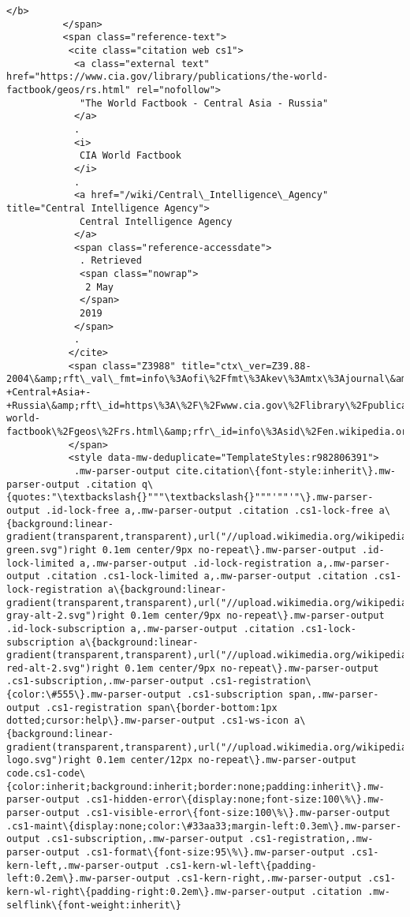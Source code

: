 \documentclass[11pt]{article}
\begin{document}
\begin{Verbatim}[commandchars=\\\{\}]
           </b>
          </span>
          <span class="reference-text">
           <cite class="citation web cs1">
            <a class="external text" href="https://www.cia.gov/library/publications/the-world-factbook/geos/rs.html" rel="nofollow">
             "The World Factbook - Central Asia - Russia"
            </a>
            .
            <i>
             CIA World Factbook
            </i>
            .
            <a href="/wiki/Central\_Intelligence\_Agency" title="Central Intelligence Agency">
             Central Intelligence Agency
            </a>
            <span class="reference-accessdate">
             . Retrieved
             <span class="nowrap">
              2 May
             </span>
             2019
            </span>
            .
           </cite>
           <span class="Z3988" title="ctx\_ver=Z39.88-2004\&amp;rft\_val\_fmt=info\%3Aofi\%2Ffmt\%3Akev\%3Amtx\%3Ajournal\&amp;rft.genre=unknown\&amp;rft.jtitle=CIA+World+Factbook\&amp;rft.atitle=The+World+Factbook+-+Central+Asia+-+Russia\&amp;rft\_id=https\%3A\%2F\%2Fwww.cia.gov\%2Flibrary\%2Fpublications\%2Fthe-world-factbook\%2Fgeos\%2Frs.html\&amp;rfr\_id=info\%3Asid\%2Fen.wikipedia.org\%3AList+of+Asian+countries+by+area">
           </span>
           <style data-mw-deduplicate="TemplateStyles:r982806391">
            .mw-parser-output cite.citation\{font-style:inherit\}.mw-parser-output .citation q\{quotes:"\textbackslash{}"""\textbackslash{}"""'""'"\}.mw-parser-output .id-lock-free a,.mw-parser-output .citation .cs1-lock-free a\{background:linear-gradient(transparent,transparent),url("//upload.wikimedia.org/wikipedia/commons/6/65/Lock-green.svg")right 0.1em center/9px no-repeat\}.mw-parser-output .id-lock-limited a,.mw-parser-output .id-lock-registration a,.mw-parser-output .citation .cs1-lock-limited a,.mw-parser-output .citation .cs1-lock-registration a\{background:linear-gradient(transparent,transparent),url("//upload.wikimedia.org/wikipedia/commons/d/d6/Lock-gray-alt-2.svg")right 0.1em center/9px no-repeat\}.mw-parser-output .id-lock-subscription a,.mw-parser-output .citation .cs1-lock-subscription a\{background:linear-gradient(transparent,transparent),url("//upload.wikimedia.org/wikipedia/commons/a/aa/Lock-red-alt-2.svg")right 0.1em center/9px no-repeat\}.mw-parser-output .cs1-subscription,.mw-parser-output .cs1-registration\{color:\#555\}.mw-parser-output .cs1-subscription span,.mw-parser-output .cs1-registration span\{border-bottom:1px dotted;cursor:help\}.mw-parser-output .cs1-ws-icon a\{background:linear-gradient(transparent,transparent),url("//upload.wikimedia.org/wikipedia/commons/4/4c/Wikisource-logo.svg")right 0.1em center/12px no-repeat\}.mw-parser-output code.cs1-code\{color:inherit;background:inherit;border:none;padding:inherit\}.mw-parser-output .cs1-hidden-error\{display:none;font-size:100\%\}.mw-parser-output .cs1-visible-error\{font-size:100\%\}.mw-parser-output .cs1-maint\{display:none;color:\#33aa33;margin-left:0.3em\}.mw-parser-output .cs1-subscription,.mw-parser-output .cs1-registration,.mw-parser-output .cs1-format\{font-size:95\%\}.mw-parser-output .cs1-kern-left,.mw-parser-output .cs1-kern-wl-left\{padding-left:0.2em\}.mw-parser-output .cs1-kern-right,.mw-parser-output .cs1-kern-wl-right\{padding-right:0.2em\}.mw-parser-output .citation .mw-selflink\{font-weight:inherit\}

\end{Verbatim}
\end{document}
